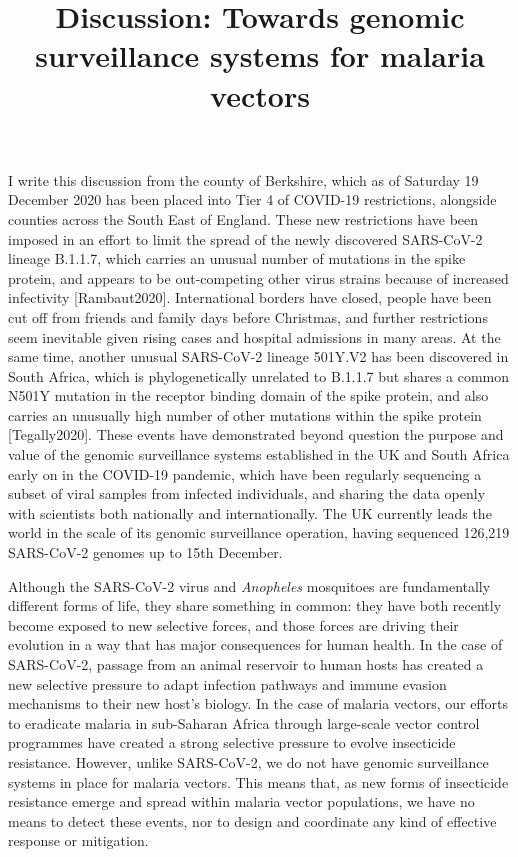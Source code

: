 \documentclass[a4paper,11pt,abstracton,hidelinks]{scrartcl}
\title{
Discussion: Towards genomic surveillance systems for malaria vectors
}
\author{}
\begin{document}
\renewcommand{\abstractname}{Summary}


\maketitle


I write this discussion from the county of Berkshire, which as of Saturday 19 December 2020 has been placed into Tier 4 of COVID-19 restrictions, alongside counties across the South East of England.
%
These new restrictions have been imposed in an effort to limit the spread of the newly discovered SARS-CoV-2 lineage B.1.1.7, which carries an unusual number of mutations in the spike protein, and appears to be out-competing other virus strains because of increased infectivity [Rambaut2020].
%
International borders have closed, people have been cut off from friends and family days before Christmas, and further restrictions seem inevitable given rising cases and hospital admissions in many areas.
%
At the same time, another unusual SARS-CoV-2 lineage 501Y.V2 has been discovered in South Africa, which is phylogenetically unrelated to B.1.1.7 but shares a common N501Y mutation in the receptor binding domain of the spike protein, and also carries an unusually high number of other mutations within the spike protein [Tegally2020].
%
These events have demonstrated beyond question the purpose and value of the genomic surveillance systems established in the UK and South Africa early on in the COVID-19 pandemic, which have been regularly sequencing a subset of viral samples from infected individuals, and sharing the data openly with scientists both nationally and internationally.
%
The UK currently leads the world in the scale of its genomic surveillance operation, having sequenced 126,219 SARS-CoV-2 genomes up to 15th December.


Although the SARS-CoV-2 virus and \textit{Anopheles} mosquitoes are fundamentally different forms of life, they share something in common: they have both recently become exposed to new selective forces, and those forces are driving their evolution in a way that has major consequences for human health.
%
In the case of SARS-CoV-2, passage from an animal reservoir to human hosts has created a new selective pressure to adapt infection pathways and immune evasion mechanisms to their new host's biology.
%
In the case of malaria vectors, our efforts to eradicate malaria in sub-Saharan Africa through large-scale vector control programmes have created a strong selective pressure to evolve insecticide resistance.
%
However, unlike SARS-CoV-2, we do not have genomic surveillance systems in place for malaria vectors.
%
This means that, as new forms of insecticide resistance emerge and spread within malaria vector populations, we have no means to detect these events, nor to design and coordinate any kind of effective response or mitigation.
\end{document}
